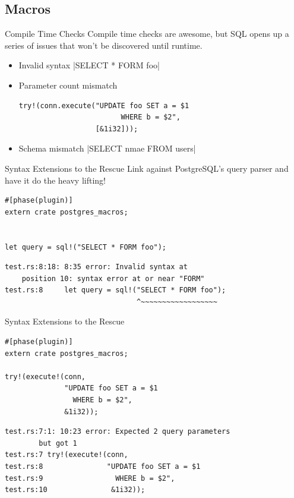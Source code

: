 \documentclass{beamer}
\begin{document}
\subsection{Macros}

\begin{frame}[fragile]{Compile Time Checks}
    Compile time checks are awesome, but SQL opens up a series of issues that
    won't be discovered until runtime.
    \begin{itemize}
        \item Invalid syntax |SELECT * FORM foo|
        \item Parameter count mismatch
        \begin{verbatim}
try!(conn.execute("UPDATE foo SET a = $1
                        WHERE b = $2",
                  [&1i32]));
        \end{verbatim}
        \item Schema mismatch |SELECT nmae FROM users|
    \end{itemize}
\end{frame}

\begin{frame}[fragile]{Syntax Extensions to the Rescue}
    Link against PostgreSQL's query parser and have it do the heavy lifting!
    \begin{verbatim}
#[phase(plugin)]
extern crate postgres_macros;


let query = sql!("SELECT * FORM foo");
    \end{verbatim}
    \begin{verbatim}
test.rs:8:18: 8:35 error: Invalid syntax at
    position 10: syntax error at or near "FORM"
test.rs:8     let query = sql!("SELECT * FORM foo");
                               ^~~~~~~~~~~~~~~~~~~
    \end{verbatim}
\end{frame}

\begin{frame}[fragile]{Syntax Extensions to the Rescue}
    \begin{verbatim}
#[phase(plugin)]
extern crate postgres_macros;

try!(execute!(conn,
              "UPDATE foo SET a = $1
                WHERE b = $2",
              &1i32));
    \end{verbatim}
    \begin{verbatim}
test.rs:7:1: 10:23 error: Expected 2 query parameters
        but got 1
test.rs:7 try!(execute!(conn,
test.rs:8               "UPDATE foo SET a = $1
test.rs:9                 WHERE b = $2",
test.rs:10               &1i32));
    \end{verbatim}
\end{frame}
\end{document}
